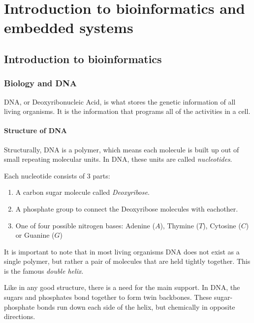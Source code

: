 
\chapter{Introduction to bioinformatics and embedded systems}

\section{Introduction to bioinformatics}

\subsection{Biology and DNA}

DNA, or Deoxyribonucleic Acid, is what stores the genetic information of all living organisms. It is the information that programs all of the activities in a cell.

\subsubsection{Structure of DNA}

Structurally, DNA is a polymer, which means each molecule is built up out of small repeating molecular units. In DNA, these units are called \emph{nucleotides}.

Each nucleotide consists of 3 parts:

\begin{enumerate}
	\item A carbon sugar molecule called \emph{Deoxyribose}. 
	\item A phosphate group to connect the Deoxyribose molecules with eachother. 
	\item One of four possible nitrogen bases: Adenine ($A$), Thymine ($T$), Cytosine ($C$) or Guanine ($G$)
\end{enumerate}

It is important to note that in most living organisms DNA does not exist as a single polymer, but rather a pair of molecules that are held tightly together. This is the famous \emph{double helix}.

Like in any good structure, there is a need for the main support. In DNA, the sugars and phosphates bond together to form twin backbones. These sugar-phosphate bonds run down each side of the helix, but chemically in opposite directions. 

